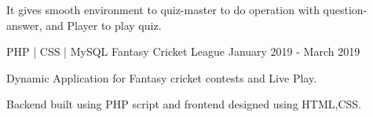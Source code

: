 \begin{cventries}
{\begin{cvitems}
		\item {It gives smooth environment to quiz-master to do operation with question-answer, and Player to play quiz.}
      \end{cvitems}
    }
    \cventry
    {PHP | CSS | MySQL} %
    {Fantasy Cricket League} %
    {} %
    {January 2019 - March 2019} %
    {
      \begin{cvitems} %
      	\item {Dynamic Application for Fantasy cricket contests and Live Play.}
		\item {Backend built using PHP script and frontend designed using HTML,CSS.}
      \end{cvitems}
    }
\end{cventries}